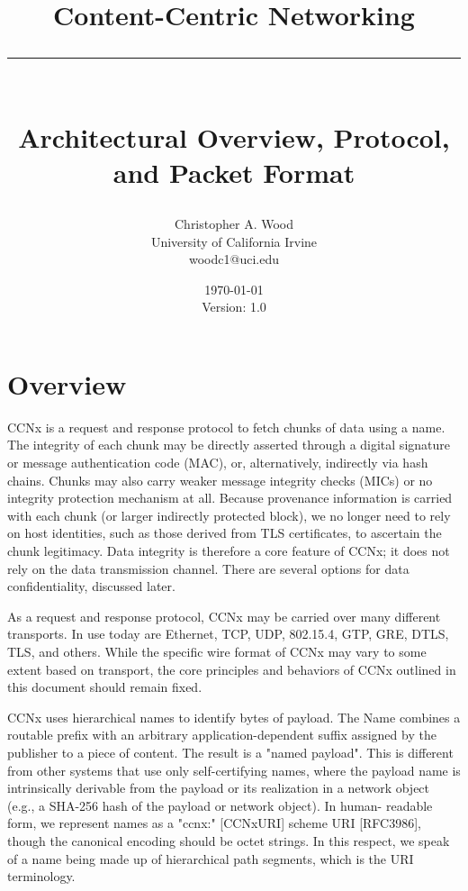 \documentclass[12pt]{article}
\newcommand{\HRule}[1]{\rule{\linewidth}{#1}}
\begin{document}
\title{ \LARGE \textbf{Content-Centric Networking}
        \HRule{2pt} \\ [0.5cm]
        \large Architectural Overview, Protocol, and Packet Format}

\date{\today \\ Version: 1.0}

\author{
        Christopher A. Wood \\
        University of California Irvine \\
        woodc1@uci.edu }

\maketitle
\tableofcontents
\newpage


\section{Overview}
CCNx is a request and response protocol to fetch chunks of data using
a name.  The integrity of each chunk may be directly asserted through
a digital signature or message authentication code (MAC), or,
alternatively, indirectly via hash chains.  Chunks may also carry
weaker message integrity checks (MICs) or no integrity protection
mechanism at all.  Because provenance information is carried with
each chunk (or larger indirectly protected block), we no longer need
to rely on host identities, such as those derived from TLS
certificates, to ascertain the chunk legitimacy.  Data integrity is
therefore a core feature of CCNx; it does not rely on the data
transmission channel.  There are several options for data
confidentiality, discussed later.

As a request and response protocol, CCNx may be carried over many
different transports.  In use today are Ethernet, TCP, UDP, 802.15.4,
GTP, GRE, DTLS, TLS, and others.  While the specific wire format of
CCNx may vary to some extent based on transport, the core principles
and behaviors of CCNx outlined in this document should remain fixed.

CCNx uses hierarchical names to identify bytes of payload.  The Name
combines a routable prefix with an arbitrary application-dependent
suffix assigned by the publisher to a piece of content.  The result
is a "named payload".  This is different from other systems that use
only self-certifying names, where the payload name is intrinsically
derivable from the payload or its realization in a network object
(e.g., a SHA-256 hash of the payload or network object).  In human-
readable form, we represent names as a "ccnx:" [CCNxURI] scheme URI
[RFC3986], though the canonical encoding should be octet strings.  In
this respect, we speak of a name being made up of hierarchical path
segments, which is the URI terminology.
\end{document}
